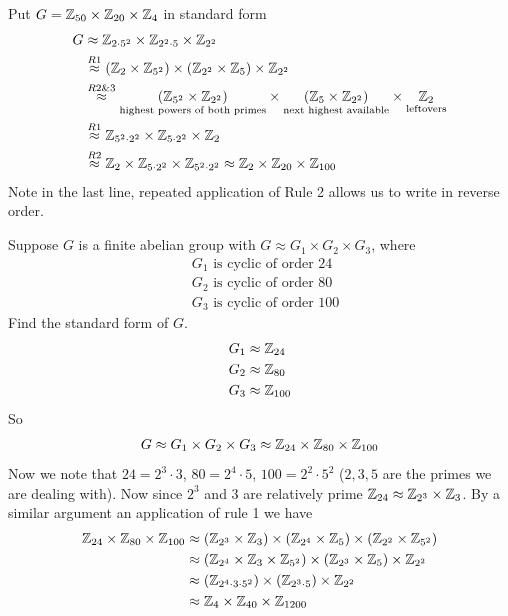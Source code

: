 \begin{example}
Put $G= {\mathbb{ Z}}_{50}\times {\mathbb{ Z}}_{20}\times {\mathbb{ Z}}_4$ in standard form
\begin{align}
    G &\approx {\mathbb{ Z}}_{2\cdot 5^2}\times {\mathbb{ Z}}_{2^2\cdot 5}\times {\mathbb{ Z}}_{2^2} \nonumber \\
    &\overset{R1}{\approx} ({\mathbb{ Z}}_2\times {\mathbb{ Z}}_{5^2})\times ({\mathbb{ Z}}_{2^2}\times {\mathbb{ Z}}_{5})\times {\mathbb{ Z}}_{2^2} \nonumber \\
    &\overset{R2\&3}{\approx}\underset{\text{highest powers of both primes}}{({\mathbb{ Z}}_{5^2}\times {\mathbb{ Z}}_{2^2})}\times \underset{\text{next highest available}}{({\mathbb{ Z}}_{5}\times {\mathbb{ Z}}_{2^2})}\times \underset{\text{leftovers}}{{\mathbb{ Z}}_2} \nonumber \\
    &\overset{R1}{\approx} {\mathbb{ Z}}_{5^2\cdot 2^2}\times {\mathbb{ Z}}_{5\cdot 2^2}\times {\mathbb{ Z}}_{2} \nonumber \\
    &\overset{R2}{\approx} {\mathbb{ Z}}_2 \times {\mathbb{ Z}}_{5\cdot 2^2}\times {\mathbb{ Z}}_{5^2 \cdot 2^2} \approx {\mathbb{ Z}}_2\times {\mathbb{ Z}}_{20} \times {\mathbb{ Z}}_{100} \nonumber
\end{align}
Note in the last line, repeated application of Rule 2 allows us to write in reverse order.
\end{example}

\begin{example}
Suppose $G$ is a finite abelian group with $G\approx G_1\times G_2\times G_3$, where
\begin{align}
    &G_1 \text{ is cyclic of order }24 \nonumber \\
    &G_2 \text{ is cyclic of order }80 \nonumber \\
    &G_3 \text{ is cyclic of order }100 \nonumber
\end{align}
Find the standard form of $G$.
\begin{align}
    G_1 &\approx {\mathbb{ Z}}_{24} \nonumber \\
    G_2 &\approx {\mathbb{ Z}}_{80} \nonumber \\
    G_3 &\approx {\mathbb{ Z}}_{100} \nonumber
\end{align}
So
\begin{align}
  G\approx G_1\times G_2\times G_3 \approx {\mathbb{ Z}}_{24}\times {\mathbb{ Z}}_{80}\times {\mathbb{ Z}}_{100}  \nonumber
\end{align}
Now we note that $24=2^3\cdot 3$, $80=2^4\cdot 5$, $100=2^2\cdot 5^2$ ($2,3,5$ are the primes we are dealing with). Now since $2^3$ and $3$ are relatively prime ${\mathbb{ Z}}_{24}\approx {\mathbb{ Z}}_{2^3}\times {\mathbb{ Z}}_{3}$. By a similar argument an application of rule 1 we have
\begin{align}
    {\mathbb{ Z}}_{24}\times {\mathbb{ Z}}_{80} \times {\mathbb{ Z}}_{100} &\approx ({\mathbb{ Z}}_{2^3}\times {\mathbb{ Z}}_{3})\times ({\mathbb{ Z}}_{2^4}\times {\mathbb{ Z}}_{5})\times ({\mathbb{ Z}}_{2^2}\times {\mathbb{ Z}}_{5^2}) \nonumber \\
    &\approx ({\mathbb{ Z}}_{2^4}\times {\mathbb{ Z}}_{3}\times {\mathbb{ Z}}_{5^2})\times ({\mathbb{ Z}}_{2^3}\times {\mathbb{ Z}}_{5})\times {\mathbb{ Z}}_{2^2} \nonumber \\
    &\approx ({\mathbb{ Z}}_{2^4\cdot 3 \cdot 5^2})\times ({\mathbb{ Z}}_{2^3\cdot 5})\times {\mathbb{ Z}}_{2^2} \nonumber \\
    &\approx {\mathbb{ Z}}_{4}\times {\mathbb{ Z}}_{40} \times {\mathbb{ Z}}_{1200} \nonumber
\end{align}
\end{example}

